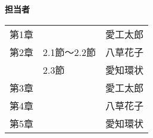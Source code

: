 \thispagestyle{myheadings}

\vspace*{8cm}

\begin{table}[h]
  \centering
  \textbf{担当者\\}
\begin{tabular}[p]{lll}
  第1章 & & 愛工太郎\\
  第2章 & 2.1節〜2.2節& 八草花子\\
        & 2.3節 & 愛知環状\\
  第3章 & &愛工太郎\\
  第4章 & &八草花子\\
  第5章 & & 愛知環状\\
\end{tabular}
\end{table}

